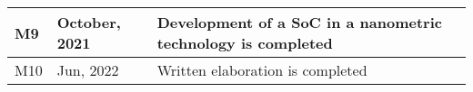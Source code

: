 \begin{table}[p]
\begin{tabular}{|l|l|m{8.5cm}|}
		M9                 & October, 2021   & Development of a SoC in a nanometric technology is completed                                                                                                                                                                                                                                                                                                                                                                                                                        \\ \hline
		M10                & Jun, 2022       & Written elaboration is completed                                                                                                                                                                                                                                                                                                                                                                                                                                                    \\ \hline
	\end{tabular}
\end{table}


\pagebreak